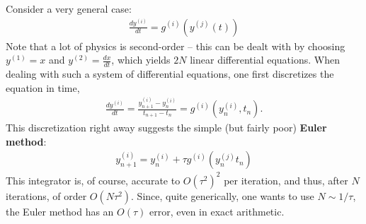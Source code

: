 \documentclass{mathnotes}
\begin{document}
Consider a very general case:
\begin{align*}
    \frac{dy^{(i)}}{dt}=g^{(i)}\left(y^{(j)}(t)\right)
\end{align*}
Note that a lot of physics is second-order -- this can be dealt with by choosing $y^{(1)}=x$ and $y^{(2)}=\frac{dx}{dt}$, which yields $2N$ linear differential
equations. When dealing with such a system of differential equations, one first discretizes the equation in time,
\begin{align*}
    \frac{dy^{(i)}}{dt}=\frac{y^{(i)}_{n+1}-y^{(i)}_n}{t_{n+1}-t_n}=g^{(i)}\left( y^{(i)}_n,t_n \right).
\end{align*}
This discretization right away suggests the simple (but fairly poor) \textbf{Euler method}:
\begin{align*}
    y^{(i)}_{n+1}=y^{(i)}_n+\tau g^{(i)}\left( y^{(j)}_nt_n \right)
\end{align*}
This integrator is, of course, accurate to $O(\tau^2)^2$ per iteration, and thus, after $N$ iterations, of order $O(N\tau^2)$. Since, quite generically, one
wants to use $N\sim1/\tau$, the Euler method has an $O(\tau)$ error, even in exact arithmetic.
\end{document}
